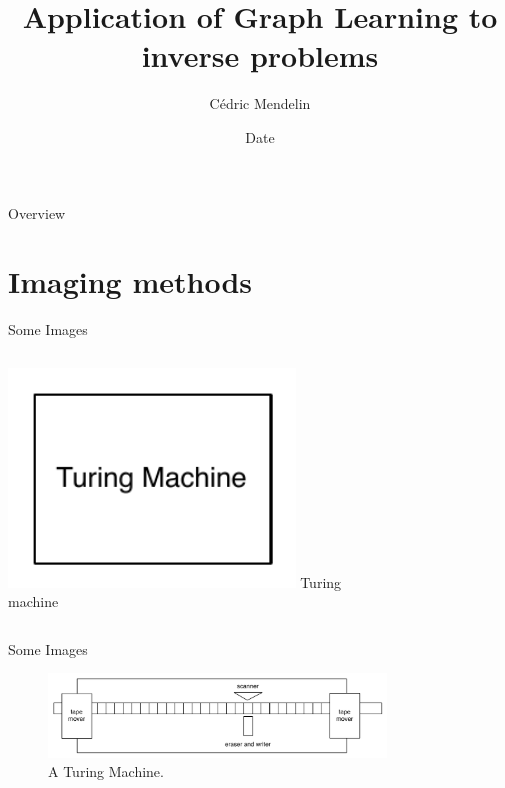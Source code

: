 \documentclass[aspectratio=169]{beamer}
\title              {Application of Graph Learning to inverse problems}
\author     		{Cédric Mendelin}
\institute          {Department of Mathematics and Computer Science, University of Basel}
\date               {Date}
\begin{document}
\begin{frame}[t,plain]
    \titlepage
\end{frame}

\begin{frame}[t]{Overview}
    \tableofcontents
\end{frame}


\section{Imaging methods}	%


\begin{frame}[c]{Some Images}
\begin{columns}[c]
            \includegraphics[width=0.8\textwidth]{block}
            Turing machine \cite{diffusionMaps}
\end{columns}
\end{frame}


\begin{frame}[c]{Some Images}
    \begin{figure}
        \includegraphics[width=0.8\textwidth]{turingmachine}
        \caption{A Turing Machine.}
    \end{figure}
\end{frame}
\end{document}
